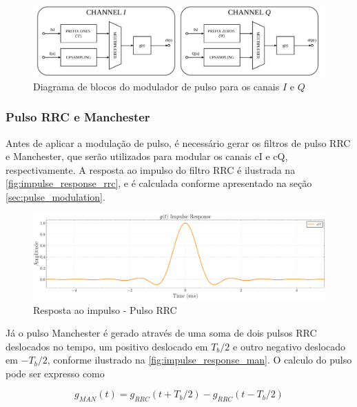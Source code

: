 \begin{figure}[H]
    \centering
    \caption{Diagrama de blocos do modulador de pulso para os canais $I$ e $Q$}\label{fig:pulse_modulate_diagram}
    \includegraphics[width=\linewidth]{assets/diagrams/pulse_modulate.pdf}
\end{figure}

\subsubsection{Pulso RRC e Manchester}

Antes de aplicar a modulação de pulso, é necessário gerar os filtros de pulso \gls{RRC} e \gls{Manchester}, que serão utilizados para modular os canais \gls{cI} e \gls{cQ}, respectivamente. A resposta ao impulso do filtro \gls{RRC} é ilustrada na \autoref{fig:impulse_response_rrc}, e é calculada conforme apresentado na seção \ref{sec:pulse_modulation}. 

\begin{figure}[H]
	\centering
	\caption{Resposta ao impulso - Pulso RRC}\label{fig:impulse_response_rrc}
	\includegraphics[width=\linewidth]{assets/cap3/example_formatter_impulse.pdf}
\end{figure}

Já o pulso \gls{Manchester} é gerado através de uma soma de dois pulsos \gls{RRC} deslocados no tempo, um positivo deslocado em $T_b/2$ e outro negativo deslocado em $-T_b/2$, conforme ilustrado na \autoref{fig:impulse_response_man}. O calculo do pulso pode ser expresso como 

\begin{equation}
g_{MAN}(t) = g_{RRC}(t + T_b/2) - g_{RRC}(t - T_b/2)
\end{equation}

